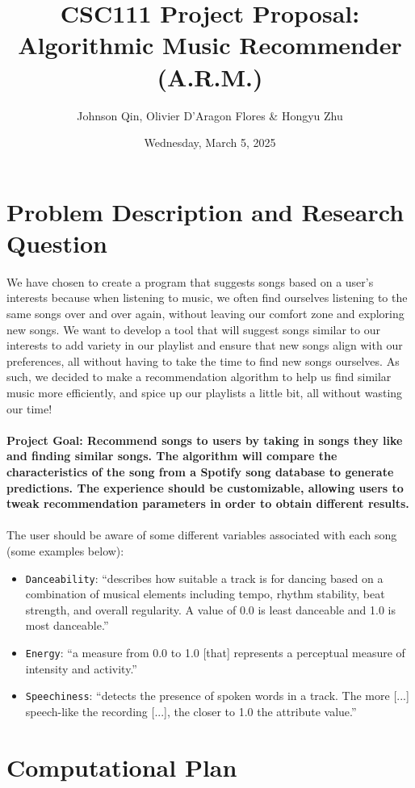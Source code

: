 \documentclass[fontsize=11pt]{article}
\title{CSC111 Project Proposal: Algorithmic Music Recommender (A.R.M.)}
\author{Johnson Qin, Olivier D'Aragon Flores \& Hongyu Zhu}
\date{Wednesday, March 5, 2025}
\begin{document}
\maketitle

\section*{Problem Description and Research Question}

We have chosen to create a program that suggests songs based on a user’s interests because when listening to music, we often find ourselves listening to the same songs over and over again, without leaving our comfort zone and exploring new songs. We want to develop a tool that will suggest songs similar to our interests to add variety in our playlist and ensure that new songs align with our preferences, all without having to take the time to find new songs ourselves. As such, we decided to make a recommendation algorithm to help us find similar music more efficiently, and spice up our playlists a little bit, all without wasting our time! \\
\\ \textbf{Project Goal: Recommend songs to users by taking in songs they like and finding similar songs. The algorithm will compare the characteristics of the song from a Spotify song database to generate predictions. The experience should be customizable, allowing users to tweak recommendation parameters in order to obtain different results.}\\ 
\\ The user should be aware of some different variables associated with each song (some examples below):
\begin{itemize}
    \item \texttt{Danceability}: “describes how suitable a track is for dancing based on a combination of musical elements including tempo, rhythm stability, beat strength, and overall regularity. A value of 0.0 is least danceable and 1.0 is most danceable.”
    \item \texttt{Energy}: “a measure from 0.0 to 1.0 [that] represents a perceptual measure of intensity and activity.”
    \item \texttt{Speechiness}: “detects the presence of spoken words in a track. The more [...] speech-like the recording [...], the closer to 1.0 the attribute value.” 
\end{itemize}

\section*{Computational Plan}
\end{document}
